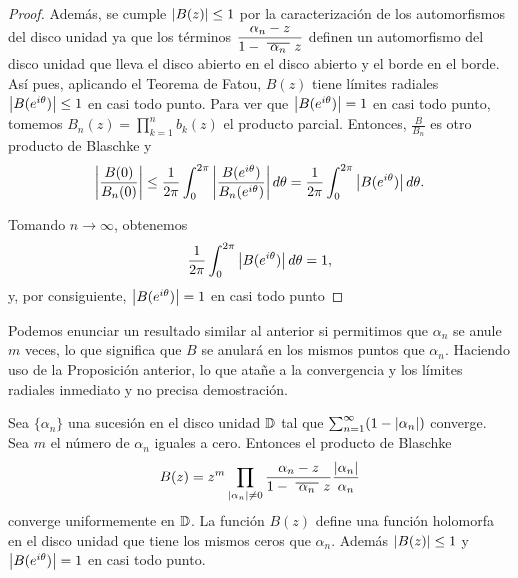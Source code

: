 \begin{proof}
    Además, se cumple $\left\lvert B(z)\right\rvert \leq 1$ por la caracterización de los automorfismos del disco unidad ya que los términos $\dfrac{\alpha_n - z}{1 - \xbar{\alpha_n}z}$ definen un automorfismo del disco unidad que lleva el disco abierto en el disco abierto y el borde en el borde. \\

    Así pues, aplicando el Teorema de Fatou, $B(z)$ tiene límites radiales $\left\lvert B(e^{i\theta})\right\rvert \leq 1$ en casi todo punto. Para ver que $\left\lvert B(e^{i \theta})\right\rvert = 1$ en casi todo punto, tomemos $B_n(z) = \prod_{k=1}^{n} b_k(z)$ el producto parcial. Entonces, $\frac{B}{B_n}$ es otro producto de Blaschke y
    \begin{equation*}
        \left\lvert\frac{B(0)}{B_n(0)}\right\rvert \leq \frac{1}{2 \pi} \int_{0}^{2 \pi} \left\lvert\frac{B(e^{i \theta})}{B_n(e^{i \theta})}\right\rvert d \theta = \frac{1}{2 \pi}  \int_{0}^{2 \pi} \left\lvert B(e^{i \theta})\right\rvert d \theta.
    \end{equation*}

    Tomando $n \to \infty$, obtenemos
    \begin{equation*}
         \frac{1}{2 \pi}  \int_{0}^{2 \pi} \left\lvert B(e^{i \theta})\right\rvert d \theta = 1,
    \end{equation*}
    y, por consiguiente, $\left\lvert B(e^{i \theta})\right\rvert = 1$ en casi todo punto
\end{proof}

Podemos enunciar un resultado similar al anterior si permitimos que $\alpha_n$ se anule $m$ veces, lo que significa que $B$ se anulará en los mismos puntos que $\alpha_n$. Haciendo uso de la Proposición anterior, lo que atañe a la convergencia y los límites radiales inmediato y no precisa demostración. \\

\begin{corollary}
    Sea $\{\alpha_n\}$ una sucesión en el disco unidad $\mathbb{D}$ tal que $\sum_{n=1}^{\infty} (1 - \left\lvert\alpha_n\right\rvert)$ converge. Sea $m$ el número de $\alpha_n$ iguales a cero. Entonces el producto de Blaschke
\begin{equation*}
    B(z) = z^m \prod_{\abs{\alpha_n} \not = 0} \frac{\alpha_n - z}{1 - \xbar{\alpha_n}z} \dfrac{\abs{\alpha_n}}{\alpha_n}
\end{equation*}
converge uniformemente en $\mathbb{D}$. La función $B(z)$ define una función holomorfa en el disco unidad que tiene los mismos ceros que $\alpha_n$. Además $\left\lvert B(z)\right\rvert \leq 1$ y $\left\lvert B(e^{i \theta})\right\rvert = 1$ en casi todo punto.
\end{corollary}

